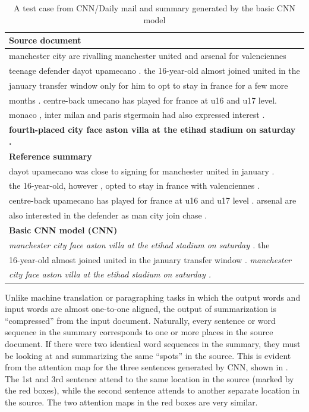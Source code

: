 \begin{table}[th]
\begin{center}
\scriptsize
\begin{tabular}{|l|}%
\hline \bf Source document \\
\hline manchester city are rivalling manchester united and arsenal for valenciennes \\
       teenage defender dayot upamecano . the 16-year-old almost joined united in the \\
	   january transfer window only for him to opt to stay in france for a few more \\
	   months . centre-back umecano has played for france at u16 and u17 level. \\
	   monaco , inter milan and paris stgermain had also expressed interest . \\
	   \textbf{fourth-placed city face aston villa at the etihad stadium on saturday .} \\
\hline \bf Reference summary \\
\hline dayot upamecano was close to signing for manchester united in january . \\
       the 16-year-old, however , opted to stay in france with valenciennes . \\
	   centre-back upamecano has played for france at u16 and u17 level . arsenal are \\
	   also interested in the defender as man city join chase . \\
\hline \bf Basic CNN model (CNN) \\
\hline \textit{manchester city face aston villa at the etihad stadium 
on saturday .} the\\ 
	16-year-old almost joined united in the january transfer window . 
	   \textit{manchester}\\
	   \textit{city face aston villa at the etihad stadium on saturday .}\\
\hline
\end{tabular}
\end{center}
\caption{\label{tab:example} A test case from CNN/Daily mail 
and summary generated by the basic CNN model}
\end{table}



Unlike machine translation or paragraphing tasks in which the output words
and input words are almost one-to-one aligned, the output of summarization
is ``compressed'' from the input document. Naturally, every sentence or 
word sequence in the summary corresponds to one or more places in the source
document. If there were two identical word sequences in the summary,
they must be looking at and summarizing the same ``spots'' in the source.
This is evident from the attention map for the three sentences generated by 
CNN, shown in . The 1st and 3rd sentence attend to
the same location in the source (marked by the red boxes), while the second
sentence attends to another separate location in the source. The two
attention maps in the red boxes are very similar.


